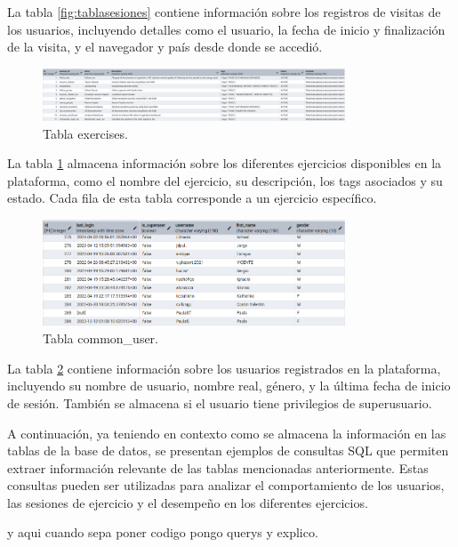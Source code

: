 \documentclass[a4paper, 12pt]{book}
\begin{document}
La tabla \ref{fig:tablasesiones} contiene información sobre los registros de visitas de los usuarios, incluyendo detalles como el usuario, la fecha de inicio y finalización de la visita, y el navegador y país desde donde se accedió.

\begin{figure}
    \centering
    \includegraphics[width=9cm, keepaspectratio]{img/tablaexercises.png}
    \caption{Tabla exercises.}\label{fig:tablaexercises}
\end{figure}

La tabla \ref{fig:tablaexercises} almacena información sobre los diferentes ejercicios disponibles en la plataforma, como el nombre del ejercicio, su descripción, los tags asociados y su estado. Cada fila de esta tabla corresponde a un ejercicio específico.

\begin{figure}
    \centering
    \includegraphics[width=9cm, keepaspectratio]{img/tablausuarios.png}
    \caption{Tabla common\_user.}\label{fig:tablausuarios}
\end{figure}

La tabla \ref{fig:tablausuarios} contiene información sobre los usuarios registrados en la plataforma, incluyendo su nombre de usuario, nombre real, género, y la última fecha de inicio de sesión. También se almacena si el usuario tiene privilegios de superusuario.

A continuación, ya teniendo en contexto como se almacena la información en las tablas de la base de datos, se presentan ejemplos de consultas SQL que permiten extraer información relevante de las tablas mencionadas anteriormente. Estas consultas pueden ser utilizadas para analizar el comportamiento de los usuarios, las sesiones de ejercicio y el desempeño en los diferentes ejercicios.

y aqui cuando sepa poner codigo pongo querys y explico.



\cleardoublepage

%
% 

\raggedright\printbibliography[heading=bibintoc,title={Referencias}]
\end{document}
